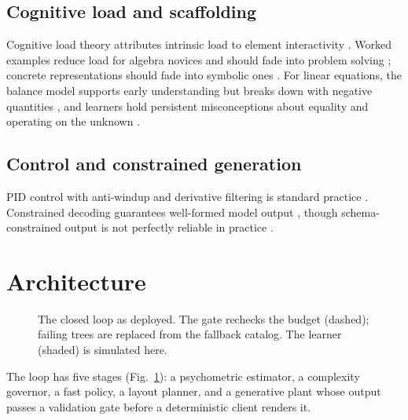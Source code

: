 \documentclass[conference]{IEEEtran}
\begin{document}
\subsection{Cognitive load and scaffolding}
Cognitive load theory \cite{sweller1988cognitive}
attributes intrinsic load to element interactivity \cite{sweller2010element}.
Worked examples reduce load for algebra novices \cite{sweller1985worked} and
should fade into problem solving \cite{renkl2003structuring,salden2010expertise};
concrete representations should fade into symbolic ones
\cite{fyfe2014concreteness}. For linear equations, the balance model supports
early understanding but breaks down with negative quantities
\cite{vlassis2002balance}, and learners hold persistent
misconceptions about equality and operating on the unknown
\cite{kieran1981equality,booth2014persistent}.

\subsection{Control and constrained generation}
PID control with anti-windup and derivative filtering is standard practice
\cite{astrom2006advanced,astrom1989windup}. Constrained
decoding guarantees well-formed model output
\cite{willard2023guided}, though schema-constrained output is not perfectly
reliable in practice \cite{geng2025jsonschemabench}.

\section{Architecture}

\begin{figure}[t]
\centering

\caption{The closed loop as deployed. The gate rechecks the budget
(dashed); failing trees are replaced from the fallback catalog. The learner
(shaded) is simulated here.}
\label{fig:arch}
\end{figure}

The loop has five stages (Fig.~\ref{fig:arch}): a psychometric
estimator, a complexity governor, a fast policy, a layout planner, and a
generative plant whose output passes a validation gate before a
deterministic client renders it.
\end{document}
